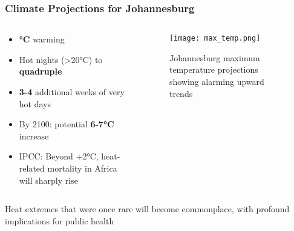 \documentclass[aspectratio=169]{beamer}
\newcommand{\statistic}[1]{\textcolor{witsaccent}{\textbf{#1}}}
\begin{document}
\begin{frame}
    \frametitle{Climate Projections for Johannesburg}
    
    \begin{columns}[T]
        \begin{column}{0.55\textwidth}
            \begin{impactbox}
                \begin{itemize}[leftmargin=*, itemsep=6pt]
                    \item \statistic{°C} warming
                    \item Hot nights (>20°C) to \statistic{quadruple}
                    \item \statistic{3-4} additional weeks of very hot days
                \end{itemize}
            \end{impactbox}
            \vspace{0.4cm}
            \begin{itemize}[leftmargin=*, itemsep=8pt]
                \item By 2100: potential \statistic{6-7°C} increase
                \item IPCC: Beyond +2°C, heat-related mortality in Africa will sharply rise
            \end{itemize}
        \end{column}
        \begin{column}{0.42\textwidth}
            \begin{figure}
                \texttt{[image: max\_temp.png]}
                \caption{\small Johannesburg maximum temperature projections showing alarming upward trends}
            \end{figure}
        \end{column}
    \end{columns}
    
    \vspace{0.3cm}
    \begin{keypoint}
        \centering
        Heat extremes that were once rare will become commonplace, with profound implications for public health
    \end{keypoint}
\end{frame}
\end{document}
